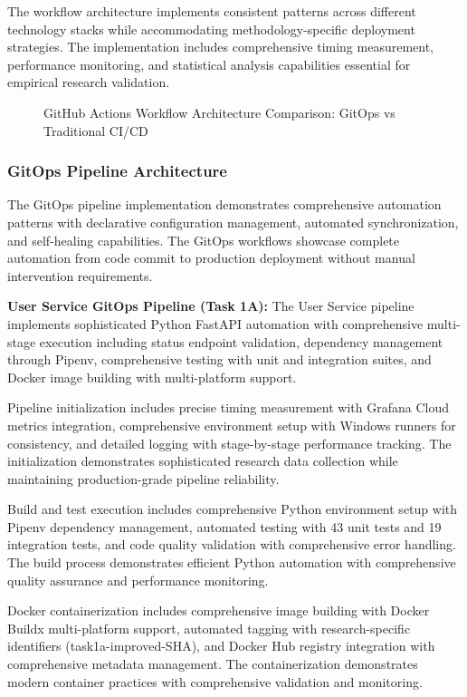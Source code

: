 The workflow architecture implements consistent patterns across different technology stacks while accommodating methodology-specific deployment strategies. The implementation includes comprehensive timing measurement, performance monitoring, and statistical analysis capabilities essential for empirical research validation.

\begin{figure}[H]
\centering
\caption{GitHub Actions Workflow Architecture Comparison: GitOps vs Traditional CI/CD}
\label{fig:github-actions-workflow-comparison}
\end{figure}

\subsubsection{GitOps Pipeline Architecture}

The GitOps pipeline implementation demonstrates comprehensive automation patterns with declarative configuration management, automated synchronization, and self-healing capabilities. The GitOps workflows showcase complete automation from code commit to production deployment without manual intervention requirements.

\textbf{User Service GitOps Pipeline (Task 1A):}
The User Service pipeline implements sophisticated Python FastAPI automation with comprehensive multi-stage execution including status endpoint validation, dependency management through Pipenv, comprehensive testing with unit and integration suites, and Docker image building with multi-platform support.

Pipeline initialization includes precise timing measurement with Grafana Cloud metrics integration, comprehensive environment setup with Windows runners for consistency, and detailed logging with stage-by-stage performance tracking. The initialization demonstrates sophisticated research data collection while maintaining production-grade pipeline reliability.

Build and test execution includes comprehensive Python environment setup with Pipenv dependency management, automated testing with 43 unit tests and 19 integration tests, and code quality validation with comprehensive error handling. The build process demonstrates efficient Python automation with comprehensive quality assurance and performance monitoring.

Docker containerization includes comprehensive image building with Docker Buildx multi-platform support, automated tagging with research-specific identifiers (task1a-improved-SHA), and Docker Hub registry integration with comprehensive metadata management. The containerization demonstrates modern container practices with comprehensive validation and monitoring.

